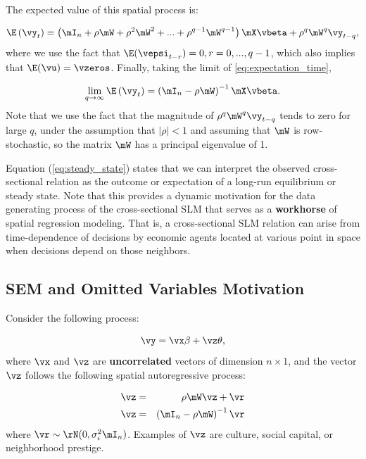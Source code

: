\documentclass[english,12pt]{book}\usepackage[]{graphicx}\usepackage[]{xcolor}
\begin{document}
The expected value of this spatial process is:

\begin{equation}\label{eq:expectation_time}
  \E\left(\vy_t\right) = \left(\mI_n + \rho\mW + \rho^2\mW^2 + ... + \rho^{q-1}\mW^{q-1}\right)\mX\vbeta + \rho^q\mW^q\vy_{t-q},
\end{equation}
%
where we use the fact that $\E(\vepsi_{t-r}) = 0, r = 0, ..., q-1$, which also implies that $\E(\vu) = \vzeros$. Finally, taking the limit of \eqref{eq:expectation_time}, 

\begin{equation}\label{eq:steady_state}
\lim_{q\to \infty} \E\left(\vy_t\right) = \left(\mI_n - \rho\mW\right)^{-1}\mX\vbeta.
\end{equation}
%
Note that we use the fact that the magnitude of $\rho^q\mW^q\vy_{t-q}$ tends to zero for large $q$, under the assumption that $\lvert \rho \rvert <1$ and assuming that $\mW$ is row-stochastic, so the matrix $\mW$ has a principal eigenvalue of 1. 

Equation (\ref{eq:steady_state}) states that we can interpret the observed cross-sectional relation as the outcome or expectation of a long-run equilibrium or steady state. Note that this provides a dynamic motivation for the data generating process of the cross-sectional SLM that serves as a \textbf{workhorse} of spatial regression modeling. That is, a cross-sectional SLM relation can arise from time-dependence of decisions by economic agents located at various point in space when decisions depend on those neighbors. 



\subsection{SEM and Omitted Variables Motivation}

Consider the following process:

\begin{equation*}
\vy = \vx\beta + \vz\theta,
\end{equation*}
%
where $\vx$ and $\vz$ are \textbf{uncorrelated} vectors of dimension $n\times 1$, and the vector $\vz$ follows the following spatial autoregressive process:

\begin{eqnarray*}
  \vz &=& \rho \mW\vz + \vr \\
  \vz &=& \left(\mI_n - \rho\mW\right)^{-1}\vr
\end{eqnarray*}
%
where $\vr \sim \rN(0, \sigma^2_{\epsilon}\mI_n)$. Examples of $\vz$ are culture, social capital, or neighborhood prestige. 
\end{document}
